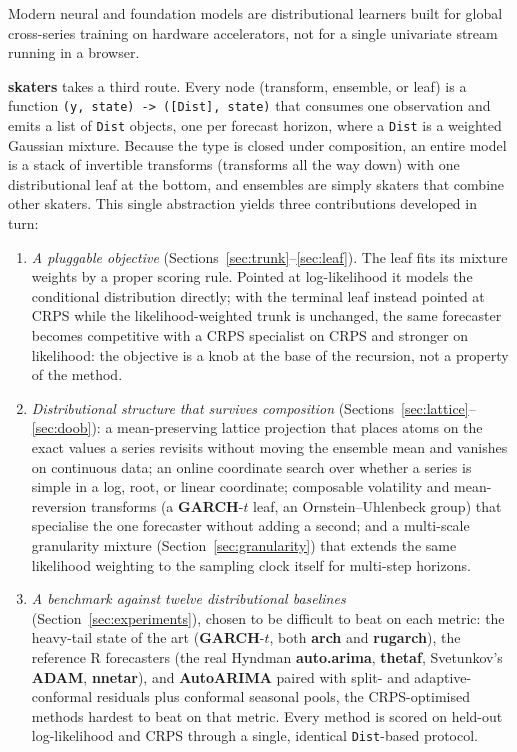 \documentclass[article]{jss}
\providecommand{\proglang}[1]{\textsf{#1}}
\providecommand{\pkg}[1]{\textbf{#1}}
\providecommand{\code}[1]{\texttt{#1}}
\begin{document}
Modern neural and foundation models
\citep{salinas2020deepar,ansari2024chronos,das2024timesfm,woo2024moirai} are
distributional learners built for global cross-series training
on hardware accelerators, not for a single univariate stream running in a
browser.

\pkg{skaters} takes a third route. Every node (transform, ensemble, or leaf)
is a function \code{(y, state) -> ([Dist], state)} that consumes one
observation and emits a list of \code{Dist} objects, one per forecast horizon,
where a \code{Dist} is a weighted Gaussian mixture. Because the type is closed
under composition, an entire model is a stack of invertible transforms
(transforms all the way down) with one distributional leaf at the bottom, and
ensembles are simply skaters that combine other skaters. This single abstraction
yields three contributions developed in turn:

\begin{enumerate}
\item \emph{A pluggable objective} (Sections~\ref{sec:trunk}--\ref{sec:leaf}).
  The leaf fits its mixture weights by a proper scoring rule. Pointed at
  log-likelihood it models the conditional distribution directly; with the
  terminal leaf instead pointed at CRPS while the likelihood-weighted trunk is
  unchanged, the same forecaster becomes competitive with a CRPS specialist on
  CRPS and stronger on likelihood: the objective is a knob at the base of the
  recursion, not a property of the method.
\item \emph{Distributional structure that survives composition}
  (Sections~\ref{sec:lattice}--\ref{sec:doob}): a mean-preserving lattice
  projection that places atoms on the exact values a series revisits without
  moving the ensemble mean and vanishes on continuous data; an online coordinate
  search over whether a series is simple in a log, root, or linear coordinate;
  composable volatility and mean-reversion transforms (a \pkg{GARCH}-$t$ leaf, an
  Ornstein--Uhlenbeck group) that specialise the one forecaster without adding a
  second; and a multi-scale granularity mixture (Section~\ref{sec:granularity})
  that extends the same likelihood weighting to the sampling clock itself for
  multi-step horizons.
\item \emph{A benchmark against twelve distributional baselines}
  (Section~\ref{sec:experiments}), chosen to be difficult to beat on each
  metric:
  the heavy-tail state of the art (\pkg{GARCH}-$t$, both \pkg{arch} and
  \pkg{rugarch}), the reference \proglang{R} forecasters (the real Hyndman
  \pkg{auto.arima}, \pkg{thetaf}, Svetunkov's \pkg{ADAM}, \pkg{nnetar}), and
  \pkg{AutoARIMA} paired with split- and adaptive-conformal residuals plus
  conformal seasonal pools, the CRPS-optimised methods hardest to beat on that
  metric. Every method is scored on held-out log-likelihood and CRPS through a
  single, identical \code{Dist}-based protocol.
\end{enumerate}
\end{document}
